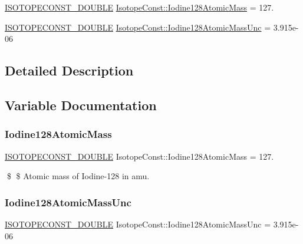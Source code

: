 \begin{DoxyCompactItemize}
\item 
\mbox{\hyperlink{group___isotope_const-_macros_ga8f45a7272ce02c0b4c65c44636ed719a}{I\+S\+O\+T\+O\+P\+E\+C\+O\+N\+S\+T\+\_\+\+D\+O\+U\+B\+LE}} \mbox{\hyperlink{group___isotope_const-_iodine-_i128_ga6847cf8b8e4191180e0f55686584be20}{Isotope\+Const\+::\+Iodine128\+Atomic\+Mass}} = 127.
\item 
\mbox{\hyperlink{group___isotope_const-_macros_ga8f45a7272ce02c0b4c65c44636ed719a}{I\+S\+O\+T\+O\+P\+E\+C\+O\+N\+S\+T\+\_\+\+D\+O\+U\+B\+LE}} \mbox{\hyperlink{group___isotope_const-_iodine-_i128_gaebdaa735731789950aac8722fc038da6}{Isotope\+Const\+::\+Iodine128\+Atomic\+Mass\+Unc}} = 3.\+915e-\/06
\end{DoxyCompactItemize}


\subsection{Detailed Description}


\subsection{Variable Documentation}
\mbox{\label{group___isotope_const-_iodine-_i128_ga6847cf8b8e4191180e0f55686584be20}} 
\subsubsection{\texorpdfstring{Iodine128\+Atomic\+Mass}{Iodine128AtomicMass}}
{\footnotesize\ttfamily \mbox{\hyperlink{group___isotope_const-_macros_ga8f45a7272ce02c0b4c65c44636ed719a}{I\+S\+O\+T\+O\+P\+E\+C\+O\+N\+S\+T\+\_\+\+D\+O\+U\+B\+LE}} Isotope\+Const\+::\+Iodine128\+Atomic\+Mass = 127.}

\$ \$ Atomic mass of Iodine-\/128 in amu. \mbox{\label{group___isotope_const-_iodine-_i128_gaebdaa735731789950aac8722fc038da6}} 
\subsubsection{\texorpdfstring{Iodine128\+Atomic\+Mass\+Unc}{Iodine128AtomicMassUnc}}
{\footnotesize\ttfamily \mbox{\hyperlink{group___isotope_const-_macros_ga8f45a7272ce02c0b4c65c44636ed719a}{I\+S\+O\+T\+O\+P\+E\+C\+O\+N\+S\+T\+\_\+\+D\+O\+U\+B\+LE}} Isotope\+Const\+::\+Iodine128\+Atomic\+Mass\+Unc = 3.\+915e-\/06}

